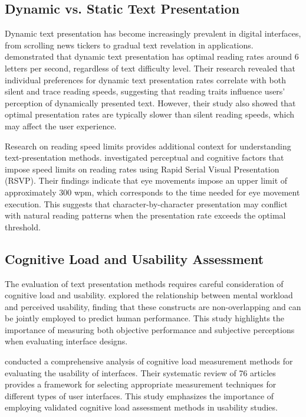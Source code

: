 \documentclass[authoryear]{elsarticle}
\begin{document}
\subsection{Dynamic vs. Static Text Presentation}
Dynamic text presentation has become increasingly prevalent in digital interfaces, from scrolling news tickers to gradual text revelation in applications. \citet{uetsuki2017} demonstrated that dynamic text presentation has optimal reading rates around 6 letters per second, regardless of text difficulty level. Their research revealed that individual preferences for dynamic text presentation rates correlate with both silent and trace reading speeds, suggesting that reading traits influence users' perception of dynamically presented text. However, their study also showed that optimal presentation rates are typically slower than silent reading speeds, which may affect the user experience.

Research on reading speed limits provides additional context for understanding text-presentation methods. \citet{primativo2016} investigated perceptual and cognitive factors that impose speed limits on reading rates using Rapid Serial Visual Presentation (RSVP). Their findings indicate that eye movements impose an upper limit of approximately 300 wpm, which corresponds to the time needed for eye movement execution. This suggests that character-by-character presentation may conflict with natural reading patterns when the presentation rate exceeds the optimal threshold.

\subsection{Cognitive Load and Usability Assessment}
The evaluation of text presentation methods requires careful consideration of cognitive load and usability. \citet{longo2018} explored the relationship between mental workload and perceived usability, finding that these constructs are non-overlapping and can be jointly employed to predict human performance. This study highlights the importance of measuring both objective performance and subjective perceptions when evaluating interface designs.

\citet{darejeh2024} conducted a comprehensive analysis of cognitive load measurement methods for evaluating the usability of interfaces. Their systematic review of 76 articles provides a framework for selecting appropriate measurement techniques for different types of user interfaces. This study emphasizes the importance of employing validated cognitive load assessment methods in usability studies.
\end{document}
